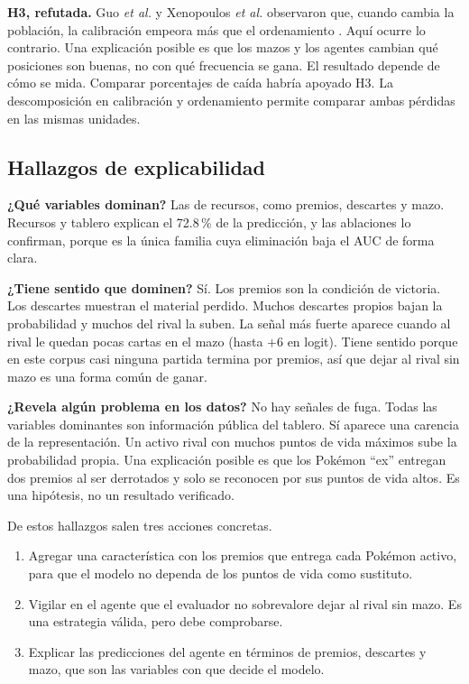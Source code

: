 \noindent\textbf{H3, refutada.} Guo \textit{et al.} y Xenopoulos \textit{et
al.} observaron que, cuando cambia la población, la calibración empeora más
que el ordenamiento \cite{guo_temporalshift_2021,xenopoulos_winprob_2022}.
Aquí ocurre lo contrario. Una explicación posible es que los mazos y los
agentes cambian qué posiciones son buenas, no con qué frecuencia se gana.
El resultado depende de cómo se mida. Comparar porcentajes de caída habría
apoyado H3. La descomposición en calibración y ordenamiento permite
comparar ambas pérdidas en las mismas unidades.

\subsection{Hallazgos de explicabilidad}
\label{subsec:discusionxai}

\noindent\textbf{¿Qué variables dominan?} Las de recursos, como premios,
descartes y mazo. Recursos y tablero explican el 72.8\,\% de la predicción,
y las ablaciones lo confirman, porque es la única familia cuya eliminación
baja el AUC de forma clara.

\noindent\textbf{¿Tiene sentido que dominen?} Sí. Los premios son la
condición de victoria. Los descartes muestran el material perdido. Muchos
descartes propios bajan la probabilidad y muchos del rival la suben. La
señal más fuerte aparece cuando al rival le quedan pocas cartas en el mazo
(hasta $+6$ en logit). Tiene sentido porque en este corpus casi ninguna
partida termina por premios, así que dejar al rival sin mazo es una forma
común de ganar.

\noindent\textbf{¿Revela algún problema en los datos?} No hay señales de
fuga. Todas las variables dominantes son información pública del tablero.
Sí aparece una carencia de la representación. Un activo rival con muchos
puntos de vida máximos sube la probabilidad propia. Una explicación posible
es que los Pok\'emon ``ex'' entregan dos premios al ser derrotados y solo se
reconocen por sus puntos de vida altos. Es una hipótesis, no un resultado
verificado.

De estos hallazgos salen tres acciones concretas.
\begin{enumerate}
  \item Agregar una característica con los premios que entrega cada
        Pok\'emon activo, para que el modelo no dependa de los puntos de
        vida como sustituto.
  \item Vigilar en el agente que el evaluador no sobrevalore dejar al rival
        sin mazo. Es una estrategia válida, pero debe comprobarse.
  \item Explicar las predicciones del agente en términos de premios,
        descartes y mazo, que son las variables con que decide el modelo.
\end{enumerate}

